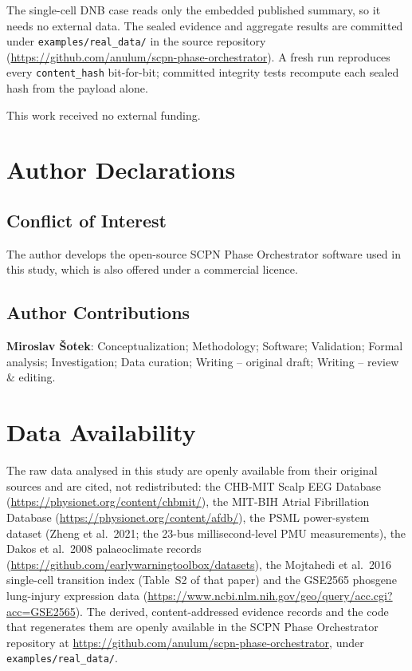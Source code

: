 \documentclass[aip,cha,preprint,amsmath,amssymb]{revtex4-2}
\newcommand{\code}[1]{\texttt{#1}}
\begin{document}
The single-cell DNB case reads only the embedded published summary, so
it needs no external data. The sealed evidence and aggregate results
are committed under \code{examples/real\_data/} in the source
repository (\url{https://github.com/anulum/scpn-phase-orchestrator}). A
fresh run reproduces every \code{content\_hash} bit-for-bit; committed
integrity tests recompute each sealed hash from the payload alone.

\begin{acknowledgments}
This work received no external funding.
\end{acknowledgments}

\section*{Author Declarations}

\subsection*{Conflict of Interest}

The author develops the open-source SCPN Phase Orchestrator software
used in this study, which is also offered under a commercial licence.

\subsection*{Author Contributions}

\textbf{Miroslav \v{S}otek}: Conceptualization; Methodology; Software;
Validation; Formal analysis; Investigation; Data curation;
Writing -- original draft; Writing -- review \& editing.

\section*{Data Availability}

The raw data analysed in this study are openly available from their
original sources and are cited, not redistributed: the CHB-MIT Scalp
EEG Database (\url{https://physionet.org/content/chbmit/}), the MIT-BIH
Atrial Fibrillation Database (\url{https://physionet.org/content/afdb/}),
the PSML power-system dataset (Zheng et al.\ 2021; the 23-bus
millisecond-level PMU measurements), the Dakos et al.\ 2008
palaeoclimate records (\url{https://github.com/earlywarningtoolbox/datasets}),
the Mojtahedi et al.\ 2016 single-cell transition index (Table~S2 of
that paper) and the GSE2565 phosgene lung-injury expression data
(\url{https://www.ncbi.nlm.nih.gov/geo/query/acc.cgi?acc=GSE2565}). The
derived, content-addressed evidence records and the code that
regenerates them are openly available in the SCPN Phase Orchestrator
repository at \url{https://github.com/anulum/scpn-phase-orchestrator},
under \code{examples/real\_data/}.
\end{document}
